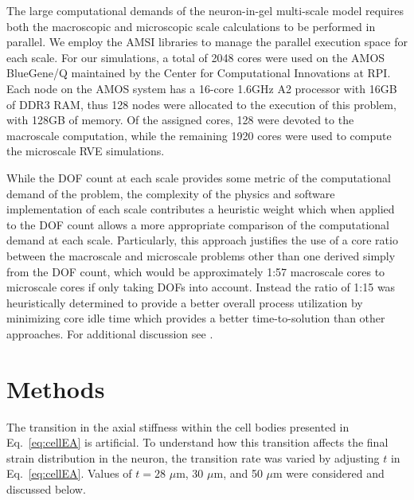 \documentclass[]{interact}
\begin{document}
The large computational demands of the neuron-in-gel multi-scale model requires both the macroscopic and microscopic scale calculations to be performed in parallel. We employ the AMSI libraries to manage the parallel execution space for each scale. For our simulations, a total of 2048 cores were used on the AMOS BlueGene/Q maintained by the Center for Computational Innovations at RPI. Each node on the AMOS system has a 16-core 1.6GHz A2 processor with 16GB of DDR3 RAM, thus 128 nodes were allocated to the execution of this problem, with 128GB of memory. Of the assigned cores, 128 were devoted to the macroscale computation, while the remaining 1920 cores were used to compute the microscale RVE simulations. 

While the DOF count at each scale provides some metric of the computational demand of the problem, the complexity of the physics and software implementation of each scale contributes a heuristic weight which when applied to the DOF count allows a more appropriate comparison of the computational demand at each scale. Particularly, this approach justifies the use of a core ratio between the macroscale and microscale problems other than one derived simply from the DOF count, which would be approximately 1:57 macroscale cores to microscale cores if only taking DOFs into account. Instead the ratio of 1:15 was heuristically determined to provide a better overall process utilization by minimizing core idle time which provides a better time-to-solution than other approaches. For additional discussion see \citep{Tobin:2017ip}.

\section{Methods}
\label{sec:methods}

The transition in the axial stiffness within the cell bodies presented in Eq.\ \eqref{eq:cellEA} is artificial. To understand how this transition affects the final strain distribution in the neuron, the transition rate was varied by adjusting $t$ in Eq.\ \eqref{eq:cellEA}. Values of $t = 28$ $\mu$m, 30 $\mu$m, and 50 $\mu$m were considered and discussed below.
\end{document}
